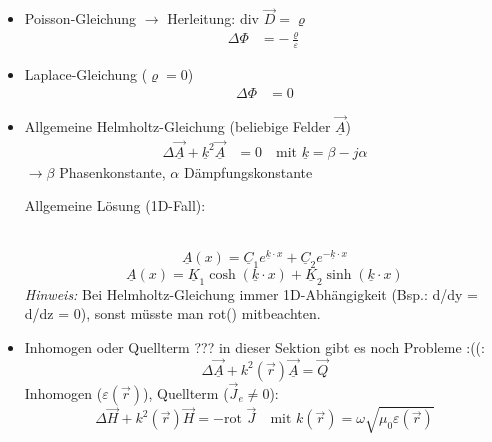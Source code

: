 \begin{itemize}
\item Poisson-Gleichung \hfill $\rightarrow$ Herleitung: $\text{div } \vec{D} = \varrho$
\begin{align}
\Delta \Phi &= -\frac{\varrho}{\varepsilon}
\end{align}

\item Laplace-Gleichung ($\varrho = 0$)
\begin{align}
\Delta \Phi &= 0
\end{align}

\item Allgemeine Helmholtz-Gleichung (beliebige Felder $\underline{\vec{A}}$)
\begin{align}
\Delta \underline{\vec{A}} + \underline{k}^2 \underline{\vec{A}} &= 0 \quad \text{mit } \underline{k} = \beta - j\alpha
\end{align}
$\rightarrow \beta$ Phasenkonstante, $\alpha$ Dämpfungskonstante


\hypertarget{helmholtz_allgemeine_loesung}{Allgemeine Lösung (1D-Fall):}\\
\begin{equation}
\underline{A}(x) = \underline{C}_1 e^{\underline{k} \cdot x} + \underline{C}_2 e^{-\underline{k} \cdot x}
\end{equation}
\begin{equation}
\underline{A}(x) = \underline{K}_1 \cosh(\underline{k} \cdot x) + \underline{K}_2 \sinh(\underline{k} \cdot x)
\end{equation}
\textit{Hinweis:} Bei Helmholtz-Gleichung immer 1D-Abhängigkeit (Bsp.: d/dy = d/dz = 0), sonst müsste man rot() mitbeachten.






\item Inhomogen oder Quellterm ??? in dieser Sektion gibt es noch Probleme :((: 
\begin{equation}
\Delta \underline{\vec{A}} + k^2(\vec{r}) \underline{\vec{A}} = \vec{Q}
\end{equation}
Inhomogen ($\varepsilon(\vec{r})$), Quellterm ($\vec{J}_e \neq 0$): 
\begin{equation}
\Delta\vec{H} + k^2(\vec{r})\vec{H} = -\text{rot } \vec{J} \quad \text{mit } k(\vec{r}) = \omega\sqrt{\mu_0\varepsilon(\vec{r})}
\end{equation}


\end{itemize}


